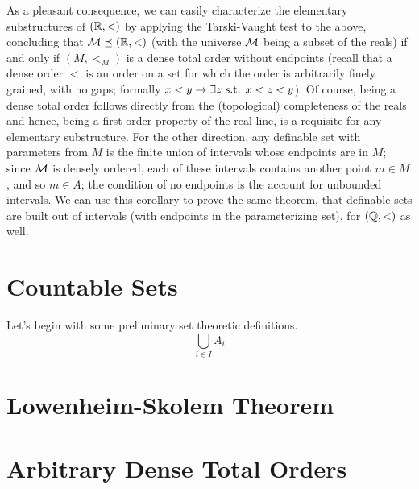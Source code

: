 \documentclass{article}
\begin{document}
As a pleasant consequence, we can easily characterize the elementary substructures of $ (\mathbb{R}, <) $ by applying the Tarski-Vaught test to the above, concluding that $ \mathcal{M} \preceq (\mathbb{R}, <) $ (with the universe $ \mathcal{M} $ being a subset of the reals) if and only if $ (M, <_M) $ is a dense total order without endpoints (recall that a dense order $ < $ is an order on a set for which the order is arbitrarily finely grained, with no gaps; formally $ x < y \rightarrow \exists z \textnormal{ s.t. } x < z < y $). Of course, being a dense total order follows directly from the (topological) completeness of the reals and hence, being a first-order property of the real line, is a requisite for any elementary substructure. For the other direction, any definable set with parameters from $ M $ is the finite union of intervals whose endpoints are in $ M $; since $ \mathcal{M} $ is densely ordered, each of these intervals contains another point $ m \in M $, and so $ m \in A $; the condition of no endpoints is the account for unbounded intervals. We can use this corollary to prove the same theorem, that definable sets are built out of intervals (with endpoints in the parameterizing set), for $ (\mathbb{Q}, <) $ as well.

\section{Countable Sets}
Let's begin with some preliminary set theoretic definitions.
    $$ \bigcup_{i \in I} A_i $$


\section{Lowenheim-Skolem Theorem}

\section{Arbitrary Dense Total Orders}
\end{document}
